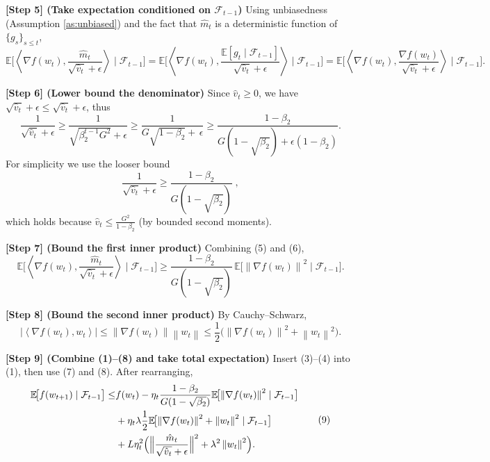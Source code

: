 \documentclass{article}
\newcommand{\EE}{\mathbb{E}}
\newcommand{\norm}[1]{\left\|#1\right\|}
\newcommand{\ip}[2]{\left\langle #1,#2\right\rangle}
\begin{document}
\noindent\textbf{[Step 5] (Take expectation conditioned on $\mathcal{F}_{t-1}$)}  
Using unbiasedness (Assumption \ref{as:unbiased}) and the fact that $\hat m_t$ is a deterministic function of $\{g_s\}_{s\le t}$,
\[
\EE\!\bigl[\ip{\nabla f(w_t)}{\frac{\hat m_t}{\sqrt{\hat v_t}+\epsilon}}\mid\mathcal{F}_{t-1}\bigr]
= \EE\!\bigl[\ip{\nabla f(w_t)}{\frac{\EE[g_t\mid\mathcal{F}_{t-1}]}{\sqrt{\hat v_t}+\epsilon}}\mid\mathcal{F}_{t-1}\bigr]
= \EE\!\bigl[\ip{\nabla f(w_t)}{\frac{\nabla f(w_t)}{\sqrt{\hat v_t}+\epsilon}}\mid\mathcal{F}_{t-1}\bigr].
\tag{5}
\]

\noindent\textbf{[Step 6] (Lower bound the denominator)}  
Since $\hat v_t\ge 0$, we have $\sqrt{\hat v_t}+\epsilon\le \sqrt{\hat v_t}+\epsilon$, thus
\[
\frac{1}{\sqrt{\hat v_t}+\epsilon}\ge\frac{1}{\sqrt{\beta_2^{t-1}G^{2}}+\epsilon}
\ge\frac{1}{G\sqrt{1-\beta_2}+\,\epsilon}
\ge\frac{1-\beta_2}{G(1-\sqrt{\beta_2})+\epsilon(1-\beta_2)} .
\]
For simplicity we use the looser bound
\[
\frac{1}{\sqrt{\hat v_t}+\epsilon}\ge\frac{1-\beta_2}{G(1-\sqrt{\beta_2})}\;,
\tag{6}
\]
which holds because $\hat v_t\le \frac{G^{2}}{1-\beta_2}$ (by bounded second moments).

\noindent\textbf{[Step 7] (Bound the first inner product)}  
Combining (5) and (6),
\[
\EE\!\bigl[\ip{\nabla f(w_t)}{\frac{\hat m_t}{\sqrt{\hat v_t}+\epsilon}}\mid\mathcal{F}_{t-1}\bigr]
\ge
\frac{1-\beta_2}{G(1-\sqrt{\beta_2})}\,
\EE\!\bigl[\norm{\nabla f(w_t)}^{2}\mid\mathcal{F}_{t-1}\bigr].
\tag{7}
\]

\noindent\textbf{[Step 8] (Bound the second inner product)}  
By Cauchy–Schwarz,
\[
\bigl|\ip{\nabla f(w_t)}{w_t}\bigr|
\le \norm{\nabla f(w_t)}\norm{w_t}
\le \frac{1}{2}\bigl(\norm{\nabla f(w_t)}^{2}+\norm{w_t}^{2}\bigr). \tag{8}
\]

\noindent\textbf{[Step 9] (Combine (1)–(8) and take total expectation)}  
Insert (3)–(4) into (1), then use (7) and (8). After rearranging,
\[
\begin{aligned}
\EE\!\bigl[f(w_{t+1})\mid\mathcal{F}_{t-1}\bigr]
\le &
f(w_t)
-\eta_t\frac{1-\beta_2}{G(1-\sqrt{\beta_2})}\EE\!\bigl[\norm{\nabla f(w_t)}^{2}\mid\mathcal{F}_{t-1}\bigr]
\\
& +\eta_t\lambda\frac{1}{2}
\EE\!\bigl[\norm{\nabla f(w_t)}^{2}+\norm{w_t}^{2}\mid\mathcal{F}_{t-1}\bigr]
\\
& +L\eta_t^{2}
\Bigl(
\Bigl\|\frac{\hat m_t}{\sqrt{\hat v_t}+\epsilon}\Bigr\|^{2}
+\lambda^{2}\norm{w_t}^{2}
\Bigr).
\end{aligned} \tag{9}
\]
\end{document}

